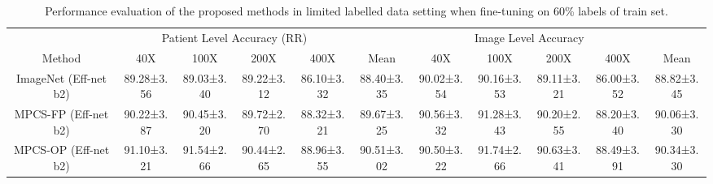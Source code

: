\documentclass[conference]{IEEEtran}
\begin{document}
\begin{table*}[h]
\end{table*} \begin{table*}[h]
\centering
\caption{Performance evaluation of the proposed methods in limited labelled data setting when fine-tuning on 60\% labels of train set.}
\label{tab:breakhis_60_label_mpcs}
\begin{adjustbox}{max width=\textwidth}
\begin{tabular}{c|cccc|c|cccc|c}
\hline
                         & \multicolumn{4}{c|}{Patient Level Accuracy (RR)}                                                                                                                                       &                                   & \multicolumn{4}{c|}{Image Level Accuracy}                                                                        &                        \\ \cline{2-5} \cline{7-10}
\multirow{-2}{*}{Method} & \multicolumn{1}{c|}{40X}        & \multicolumn{1}{c|}{100X}                               & \multicolumn{1}{c|}{200X}                              & 400X                              & \multirow{-2}{*}{Mean}            & \multicolumn{1}{c|}{40X}        & \multicolumn{1}{c|}{100X}       & \multicolumn{1}{c|}{200X}       & 400X       & \multirow{-2}{*}{Mean} \\ \hline
ImageNet (Eff-net b2)    & \multicolumn{1}{c|}{89.28±3.56} & \multicolumn{1}{c|}{89.03±3.40}                         & \multicolumn{1}{c|}{89.22±3.12}                        & 86.10±3.32                        & 88.40±3.35                        & \multicolumn{1}{c|}{90.02±3.54} & \multicolumn{1}{c|}{90.16±3.53} & \multicolumn{1}{c|}{89.11±3.21} & 86.00±3.52 & 88.82±3.45             \\
MPCS-FP (Eff-net b2)     & \multicolumn{1}{c|}{90.22±3.87} & \multicolumn{1}{c|}{90.45±3.20}                         & \multicolumn{1}{c|}{89.72±2.70}                        & 88.32±3.21                        & 89.67±3.25                        & \multicolumn{1}{c|}{90.56±3.32} & \multicolumn{1}{c|}{91.28±3.43} & \multicolumn{1}{c|}{90.20±2.55} & 88.20±3.40 & 90.06±3.30             \\
MPCS-OP (Eff-net b2)     & \multicolumn{1}{c|}{91.10±3.21} & \multicolumn{1}{c|}{91.54±2.66}                         & \multicolumn{1}{c|}{{\color[HTML]{1E1E1E} 90.44±2.65}} & {\color[HTML]{1E1E1E} 88.96±3.55} & 90.51±3.02                        & \multicolumn{1}{c|}{90.50±3.22} & \multicolumn{1}{c|}{91.74±2.66} & \multicolumn{1}{c|}{90.63±3.41} & 88.49±3.91 & 90.34±3.30             \\

\end{tabular}
\end{adjustbox}
\end{table*}
\end{document}
